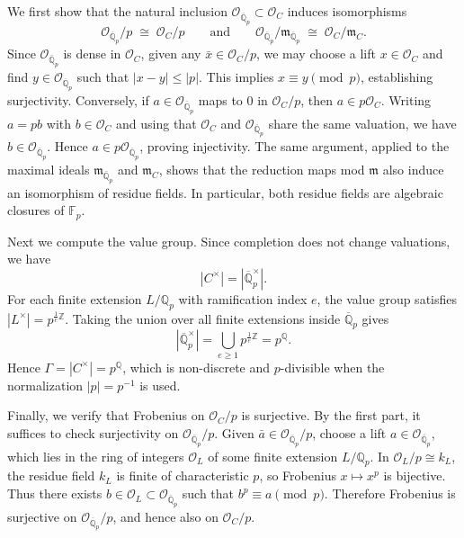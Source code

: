 \documentclass[12pt]{article}  %
\begin{document}
\begin{solution}
We first show that the natural inclusion $\mathcal{O}_{\overline{\mathbb{Q}}_p} \subset \mathcal{O}_C$ induces isomorphisms
\[
\mathcal{O}_{\overline{\mathbb{Q}}_p}/p \;\cong\; \mathcal{O}_C/p
\qquad\text{and}\qquad
\mathcal{O}_{\overline{\mathbb{Q}}_p}/\mathfrak{m}_{\overline{\mathbb{Q}}_p} \;\cong\; \mathcal{O}_C/\mathfrak{m}_C.
\]
Since $\mathcal{O}_{\overline{\mathbb{Q}}_p}$ is dense in $\mathcal{O}_C$, given any $\bar{x} \in \mathcal{O}_C/p$, we may choose a lift $x \in \mathcal{O}_C$ and find $y \in \mathcal{O}_{\overline{\mathbb{Q}}_p}$ such that $|x-y|\le |p|$. This implies $x \equiv y \pmod{p}$, establishing surjectivity. Conversely, if $a \in \mathcal{O}_{\overline{\mathbb{Q}}_p}$ maps to $0$ in $\mathcal{O}_C/p$, then $a \in p\mathcal{O}_C$. Writing $a = pb$ with $b \in \mathcal{O}_C$ and using that $\mathcal{O}_C$ and $\mathcal{O}_{\overline{\mathbb{Q}}_p}$ share the same valuation, we have $b \in \mathcal{O}_{\overline{\mathbb{Q}}_p}$. Hence $a \in p\mathcal{O}_{\overline{\mathbb{Q}}_p}$, proving injectivity. The same argument, applied to the maximal ideals $\mathfrak{m}_{\overline{\mathbb{Q}}_p}$ and $\mathfrak{m}_C$, shows that the reduction maps mod $\mathfrak m$ also induce an isomorphism of residue fields. In particular, both residue fields are algebraic closures of $\mathbb{F}_p$.

Next we compute the value group. Since completion does not change valuations, we have
\[
|C^\times| = |\overline{\mathbb{Q}}_p^\times|.
\]
For each finite extension $L/\mathbb{Q}_p$ with ramification index $e$, the value group satisfies $|L^\times| = p^{\frac{1}{e}\mathbb{Z}}$. Taking the union over all finite extensions inside $\overline{\mathbb{Q}}_p$ gives
\[
|\overline{\mathbb{Q}}_p^\times| = \bigcup_{e \ge 1} p^{\frac{1}{e}\mathbb{Z}} = p^{\mathbb{Q}}.
\]
Hence $\Gamma = |C^\times| = p^{\mathbb{Q}}$, which is non-discrete and $p$-divisible when the normalization $|p| = p^{-1}$ is used.

Finally, we verify that Frobenius on $\mathcal{O}_C/p$ is surjective. By the first part, it suffices to check surjectivity on $\mathcal{O}_{\overline{\mathbb{Q}}_p}/p$. Given $\bar{a} \in \mathcal{O}_{\overline{\mathbb{Q}}_p}/p$, choose a lift $a \in \mathcal{O}_{\overline{\mathbb{Q}}_p}$, which lies in the ring of integers $\mathcal{O}_L$ of some finite extension $L/\mathbb{Q}_p$. In $\mathcal{O}_L/p \cong k_L$, the residue field $k_L$ is finite of characteristic $p$, so Frobenius $x \mapsto x^p$ is bijective. Thus there exists $b \in \mathcal{O}_L \subset \mathcal{O}_{\overline{\mathbb{Q}}_p}$ such that $b^p \equiv a \pmod{p}$. Therefore Frobenius is surjective on $\mathcal{O}_{\overline{\mathbb{Q}}_p}/p$, and hence also on $\mathcal{O}_C/p$.
\end{solution}
\end{document}
